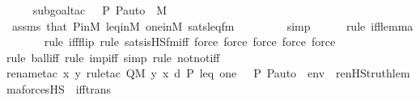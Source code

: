 \begin{isabellebody}
\ \ \ \ \isamarkupfalse%
{\isacharparenleft}{\kern0pt}subgoal{\isacharunderscore}{\kern0pt}tac\ {\isachardoublequoteopen}{\isasymlangle}{\isasymF}{\isacharcomma}{\kern0pt}\ {\isasymG}{\isacharcomma}{\kern0pt}\ P{\isacharcomma}{\kern0pt}\ P{\isacharunderscore}{\kern0pt}auto{\isasymrangle}\ {\isasymin}\ M{\isachardoublequoteclose}{\isacharparenright}{\kern0pt}\isanewline
\ \ \ \ \isamarkupfalse%
\ assms\ that\ P{\isacharunderscore}{\kern0pt}in{\isacharunderscore}{\kern0pt}M\ leq{\isacharunderscore}{\kern0pt}in{\isacharunderscore}{\kern0pt}M\ one{\isacharunderscore}{\kern0pt}in{\isacharunderscore}{\kern0pt}M\ sats{\isacharunderscore}{\kern0pt}leq{\isacharunderscore}{\kern0pt}fm\ \ \isanewline
\ \ \ \ \ \isamarkupfalse%
\ simp\isanewline
\ \ \ \ \ \isamarkupfalse%
{\isacharparenleft}{\kern0pt}rule\ iff{\isacharunderscore}{\kern0pt}lemma{\isacharparenright}{\kern0pt}\isanewline
\ \ \ \ \ \ \isamarkupfalse%
{\isacharparenleft}{\kern0pt}rule\ iff{\isacharunderscore}{\kern0pt}flip{\isacharcomma}{\kern0pt}\ rule\ sats{\isacharunderscore}{\kern0pt}is{\isacharunderscore}{\kern0pt}HS{\isacharunderscore}{\kern0pt}fm{\isacharunderscore}{\kern0pt}iff{\isacharcomma}{\kern0pt}\ force{\isacharcomma}{\kern0pt}\ force{\isacharcomma}{\kern0pt}\ force{\isacharcomma}{\kern0pt}\ force{\isacharcomma}{\kern0pt}\ force{\isacharparenright}{\kern0pt}\isanewline
\ \ \ \ \ \isamarkupfalse%
{\isacharparenleft}{\kern0pt}rule\ ball{\isacharunderscore}{\kern0pt}iff{\isacharcomma}{\kern0pt}\ rule\ imp{\isacharunderscore}{\kern0pt}iff{\isacharcomma}{\kern0pt}\ simp{\isacharcomma}{\kern0pt}\ rule\ notnot{\isacharunderscore}{\kern0pt}iff{\isacharparenright}{\kern0pt}\isanewline
\ \ \ \ \ \isamarkupfalse%
{\isacharparenleft}{\kern0pt}rename{\isacharunderscore}{\kern0pt}tac\ x\ y{\isacharcomma}{\kern0pt}\ rule{\isacharunderscore}{\kern0pt}tac\ Q{\isacharequal}{\kern0pt}{\isachardoublequoteopen}M{\isacharcomma}{\kern0pt}\ {\isacharbrackleft}{\kern0pt}y{\isacharcomma}{\kern0pt}\ x{\isacharcomma}{\kern0pt}\ d{\isacharcomma}{\kern0pt}\ P{\isacharcomma}{\kern0pt}\ leq{\isacharcomma}{\kern0pt}\ one{\isacharcomma}{\kern0pt}\ {\isasymlangle}{\isasymF}{\isacharcomma}{\kern0pt}\ {\isasymG}{\isacharcomma}{\kern0pt}\ P{\isacharcomma}{\kern0pt}\ P{\isacharunderscore}{\kern0pt}auto{\isasymrangle}{\isacharbrackright}{\kern0pt}\ {\isacharat}{\kern0pt}\ env\ {\isasymTurnstile}\ ren{\isacharunderscore}{\kern0pt}HS{\isacharunderscore}{\kern0pt}truth{\isacharunderscore}{\kern0pt}lemma{\isacharparenleft}{\kern0pt}forcesHS{\isacharparenleft}{\kern0pt}{\isasymphi}{\isacharparenright}{\kern0pt}{\isacharparenright}{\kern0pt}{\isachardoublequoteclose}\ \ iff{\isacharunderscore}{\kern0pt}trans{\isacharparenright}{\kern0pt}\isanewline

\end{isabellebody}

